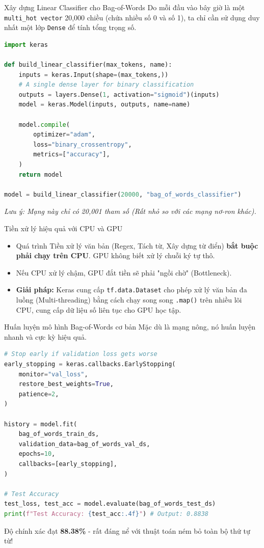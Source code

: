 \documentclass[aspectratio=169]{beamer}
\begin{document}
\begin{frame}[fragile]{Xây dựng Linear Classifier cho Bag-of-Words}
Do mỗi đầu vào bây giờ là một \texttt{multi\_hot vector} 20,000 chiều (chứa nhiều số 0 và số 1), ta chỉ cần sử dụng duy nhất một lớp \texttt{Dense} để tính tổng trọng số.
\begin{lstlisting}[language=Python]
import keras

def build_linear_classifier(max_tokens, name):
    inputs = keras.Input(shape=(max_tokens,))
    # A single dense layer for binary classification
    outputs = layers.Dense(1, activation="sigmoid")(inputs)
    model = keras.Model(inputs, outputs, name=name)
    
    model.compile(
        optimizer="adam",
        loss="binary_crossentropy",
        metrics=["accuracy"],
    )
    return model

model = build_linear_classifier(20000, "bag_of_words_classifier")
\end{lstlisting}
\textit{Lưu ý: Mạng này chỉ có 20,001 tham số (Rất nhỏ so với các mạng nơ-ron khác).}
\end{frame}

\begin{frame}{Tiền xử lý hiệu quả với CPU và GPU}
    \begin{itemize}
        \item Quá trình Tiền xử lý văn bản (Regex, Tách từ, Xây dựng từ điển) \textbf{bắt buộc phải chạy trên CPU}. GPU không biết xử lý chuỗi ký tự thô.
        \item Nếu CPU xử lý chậm, GPU đắt tiền sẽ phải "ngồi chờ" (Bottleneck).
        \item \textbf{Giải pháp:} Keras cung cấp \texttt{tf.data.Dataset} cho phép xử lý văn bản đa luồng (Multi-threading) bằng cách chạy song song \texttt{.map()} trên nhiều lõi CPU, cung cấp dữ liệu số liên tục cho GPU học tập.
    \end{itemize}
\end{frame}

\begin{frame}[fragile]{Huấn luyện mô hình Bag-of-Words cơ bản}
Mặc dù là mạng nông, nó huấn luyện nhanh và cực kỳ hiệu quả.
\begin{lstlisting}[language=Python]
# Stop early if validation loss gets worse
early_stopping = keras.callbacks.EarlyStopping(
    monitor="val_loss",
    restore_best_weights=True,
    patience=2,
)

history = model.fit(
    bag_of_words_train_ds,
    validation_data=bag_of_words_val_ds,
    epochs=10,
    callbacks=[early_stopping],
)

# Test Accuracy
test_loss, test_acc = model.evaluate(bag_of_words_test_ds)
print(f"Test Accuracy: {test_acc:.4f}") # Output: 0.8838
\end{lstlisting}
Độ chính xác đạt \textbf{88.38\%} - rất đáng nể với thuật toán ném bỏ toàn bộ thứ tự từ!
\end{frame}
\end{document}
